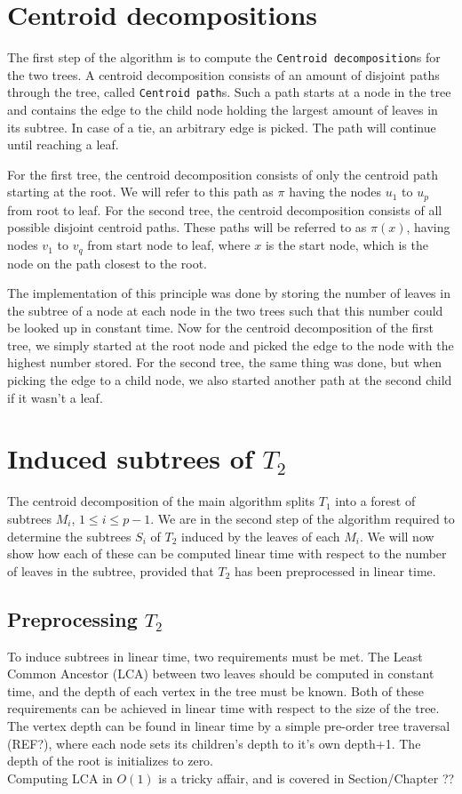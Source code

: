 
\section{Centroid decompositions}
The first step of the algorithm is to compute the \texttt{Centroid decomposition}s for the two trees. A centroid decomposition consists of an amount of disjoint paths through the tree, called \texttt{Centroid path}s. Such a path starts at a node in the tree and contains the edge to the child node holding the largest amount of leaves in its subtree. In case of a tie, an arbitrary edge is picked. The path will continue until reaching a leaf.

For the first tree, the centroid decomposition consists of only the centroid path starting at the root. We will refer to this path as $\pi$ having the nodes $u_1$ to $u_p$ from root to leaf. For the second tree, the centroid decomposition consists of all possible disjoint centroid paths. These paths will be referred to as $\pi(x)$, having nodes $v_1$ to $v_q$ from start node to leaf, where $x$ is the start node, which is the node on the path closest to the root.

The implementation of this principle was done by storing the number of leaves in the subtree of a node at each node in the two trees such that this number could be looked up in constant time. Now for the centroid decomposition of the first tree, we simply started at the root node and picked the edge to the node with the highest number stored. For the second tree, the same thing was done, but when picking the edge to a child node, we also started another path at the second child if it wasn't a leaf.

\section{Induced subtrees of $T_2$}
The centroid decomposition of the main algorithm splits $T_1$ into a forest of subtrees $M_i$, $1 \le i \le p-1$. We are in the second step of the algorithm required to determine the subtrees $S_i$ of $T_2$ induced by the leaves of each $M_i$.
We will now show how each of these can be computed linear time with respect to the number of leaves in the subtree, provided that $T_2$ has been preprocessed in linear time.

\subsection{Preprocessing $T_2$}
To induce subtrees in linear time, two requirements must be met. The Least Common Ancestor (LCA) between two leaves should be computed in constant time, and the depth of each vertex in the tree must be known. Both of these requirements can be achieved in linear time with respect to the size of the tree. 
\\
The vertex depth can be found in linear time by a simple pre-order tree traversal (REF?), where each node sets its children's depth to it's own depth+1. The depth of the root is initializes to zero.  
\\
Computing LCA in $O(1)$ is a tricky affair, and is covered in Section/Chapter ??

